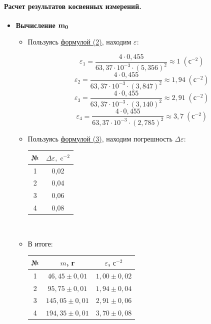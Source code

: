 \documentclass{article}
\begin{document}
\paragraph{Расчет результатов косвенных измерений.}

\begin{itemize}
	\item {\bf Вычисление $\bf m_0$}
	
	
\begin{itemize}
	\item Пользуясь \hyperlink{formuls}{формулой (2)}, находим $\varepsilon$:
	
	$$\varepsilon_1=\frac{4\cdot0,455}{63,37\cdot10^{-3}\cdot(5,356)^2}\approx1\;\left( \mbox{с}^{-2} \right) $$
	$$\varepsilon_2=\frac{4\cdot0,455}{63,37\cdot10^{-3}\cdot(3,847)^2}\approx1,94\;\left( \mbox{с}^{-2} \right) $$
	$$\varepsilon_3=\frac{4\cdot0,455}{63,37\cdot10^{-3}\cdot(3,140)^2}\approx2,91\;\left( \mbox{с}^{-2} \right) $$
	$$\varepsilon_4=\frac{4\cdot0,455}{63,37\cdot10^{-3}\cdot(2,785)^2}\approx3,7\;\left( \mbox{с}^{-2} \right) $$

	\item Пользуясь \hyperlink{formuls}{формулой (3)}, находим погрешность $\Delta \varepsilon$:
	
	\begin{tabular}{c|c}
		№ & $\Delta \varepsilon,\;\mbox{c}^{-2}$ \\
		\hline
		1 &  0,02\\
		
		2 &  0,04\\
		
		3 &  0,06\\
		
		4 &  0,08\\
	\end{tabular}\\

\item В итоге:

	\begin{tabular}{ c | c | c}
		№	& $m$, г& $\varepsilon$, $\mbox{с}^{-2}$ \\
		\hline
		1 & $46,45\pm0,01 $ &  $  1,00\pm0,02  $\\
		
		2& $ 95,75\pm0,01$ & $ 1,94\pm0,04  $ \\
		
		3& $145,05 \pm0,01 $&  $ 2,91 \pm0,06 $\\
		
		4& $ 194,35\pm0,01 $& $  3,70 \pm0,08$
	\end{tabular}\\


\end{itemize}
\end{itemize}
\end{document}
